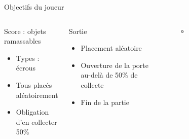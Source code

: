 \documentclass{beamer}
\begin{document}
{\begin{frame}{Objectifs du joueur}
    \begin{columns}
        \begin{block}{Score : objets ramassables}
            \begin{itemize}
                \item[\bullet] Types : écrous
                \item[\bullet] Tous placés aléatoirement
                \item[\bullet] Obligation d'en collecter 50\%
            \end{itemize}
        \end{block}
        \begin{block}{Sortie}
            \begin{itemize}
                \item[\bullet] Placement aléatoire
                \item[\bullet] Ouverture de la porte au-delà de 50\% de collecte
                \item[\bullet] Fin de la partie
            \end{itemize}
        \end{block}
        \begin{figure}
            \centering
            \includegraphics[width=0.6\textwidth]{nut}
        \end{figure}
        \begin{columns}
            \begin{figure}
                \centering

\end{figure}
\end{columns}
\end{columns}
\end{frame}}
\end{document}
